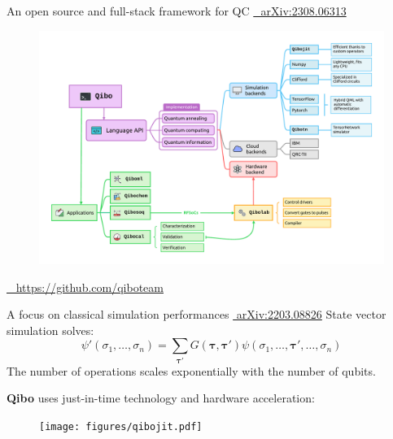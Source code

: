 \documentclass[aspectratio=169, 8pt, xcolor={svgnames}, hyperref={linkcolor=black}]{beamer}
\begin{document}
\begin{frame}{An open source and full-stack framework for QC \hfill \href{https://arxiv.org/abs/2308.06313}{\faBook\,\,	arXiv:2308.06313}}
\begin{figure}
   \includegraphics[width=0.8\linewidth]{figures/qibo_ecosystem.pdf}
\end{figure}  
\vspace{-0.8cm}
\hfill \href{https://github.com/qiboteam}{\faGithub ~ https://github.com/qiboteam}
\end{frame}

\begin{frame}{A focus on classical simulation performances \hfill \href{https://arxiv.org/abs/2203.08826}{\faBook\,\,arXiv:2203.08826}}
State vector simulation solves:
   \begin{equation*}
     \psi' (\sigma_1,\ldots,\sigma_n) = \sum_{\boldsymbol \tau'} G({\boldsymbol \tau},{\boldsymbol \tau}') \psi(\sigma_1,\ldots,{\boldsymbol \tau}',\ldots,\sigma_n)
   \end{equation*}
   The number of operations scales {\color{magenta} exponentially} with the number of qubits.

   \textbf{Qibo} uses just-in-time technology and hardware acceleration:
   \vspace{-0.35cm}
   \begin{figure}
     \texttt{[image: figures/qibojit.pdf]}
   \end{figure}

\end{frame}
\end{document}
